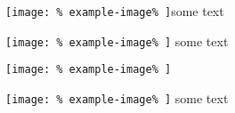 \texttt{[image: \%
	example-image\%
]}some text

\texttt{[image: \%
	example-image\%
]} some text

\texttt{[image: \%
	example-image\%
]} %

\texttt{[image: \%
	example-image\%
]}  some text
